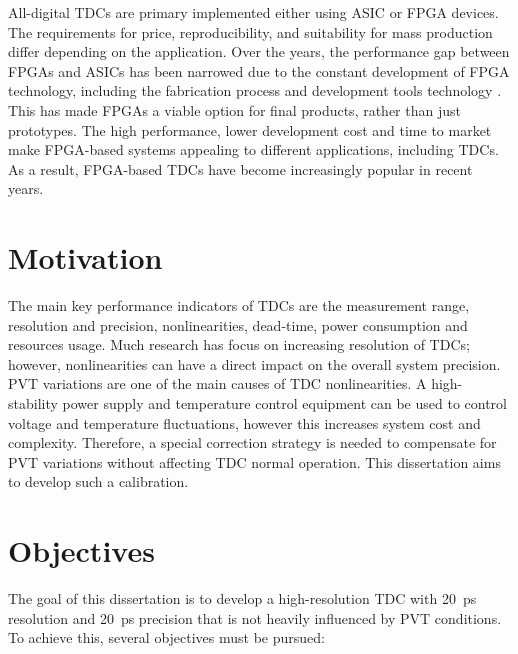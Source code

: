 All-digital \glspl{TDC} are primary implemented either using \gls{ASIC} or \gls{FPGA} devices. The requirements for price, reproducibility, and suitability for mass production differ depending on the application. Over the years, the performance gap between \glspl{FPGA} and \glspl{ASIC} has been narrowed due to the constant development of \gls{FPGA} technology, including the fabrication process and development tools technology \citep{FPGA_ASIC}. This has made \glspl{FPGA} a viable option for final products, rather than just prototypes. The high performance, lower development cost and time to market make \gls{FPGA}-based systems appealing to different applications, including \glspl{TDC}. As a result, \gls{FPGA}-based \glspl{TDC} have become increasingly popular in recent years.


\section{Motivation} %
\label{sec:motivation}

The main key performance indicators of \glspl{TDC} are the measurement range, resolution and precision, nonlinearities, dead-time, power consumption and resources usage. Much research has focus on increasing resolution of \glspl{TDC}; however, nonlinearities can have a direct impact on the overall system precision. \Gls{PVT} variations are one of the main causes of \gls{TDC} nonlinearities. A high-stability power supply and temperature control equipment can be used to control voltage and temperature fluctuations, however this increases system cost and complexity. Therefore, a special correction strategy is needed to compensate for \gls{PVT} variations without affecting \gls{TDC} normal operation. This dissertation aims to develop such a calibration.


\section{Objectives} %
\label{sec:objectives}

The goal of this dissertation is to develop a high-resolution \gls{TDC} with 20~ps resolution and 20~ps precision that is not heavily influenced by \gls{PVT} conditions. To achieve this, several objectives must be pursued:

